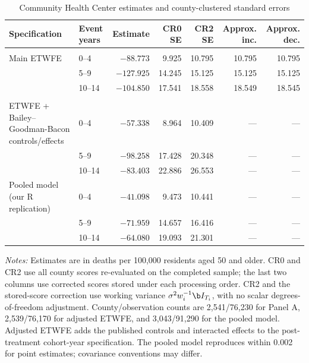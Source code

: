 \begin{table}[H]
\centering
\caption{Community Health Center estimates and county-clustered standard errors}
\label{tab:chc-estimates}
\scriptsize
\setlength{\tabcolsep}{3pt}
\begin{tabular}{@{}>{\raggedright\arraybackslash}p{}lrrrrr@{}}
\toprule
Specification & Event years & Estimate & CR0 SE & CR2 SE & Approx. inc. & Approx. dec. \\
\midrule
\multicolumn{7}{l}{\textit{Panel A. Saturated ETWFE}}\\
Main ETWFE & 0--4 & $-88.773$ & 9.925 & 10.795 & 10.795 & 10.795 \\
 & 5--9 & $-127.925$ & 14.245 & 15.125 & 15.125 & 15.125 \\
 & 10--14 & $-104.850$ & 17.541 & 18.558 & 18.549 & 18.545 \\
\addlinespace
\multicolumn{7}{l}{\textit{Panel B. Completed-sample comparisons}}\\
ETWFE + Bailey--Goodman-Bacon controls/effects & 0--4 & $-57.338$ & 8.964 & 10.409 & --- & --- \\
 & 5--9 & $-98.258$ & 17.428 & 20.348 & --- & --- \\
 & 10--14 & $-83.403$ & 22.886 & 26.553 & --- & --- \\
Pooled model (our R replication) & 0--4 & $-41.098$ & 9.473 & 10.441 & --- & --- \\
 & 5--9 & $-71.959$ & 14.657 & 16.416 & --- & --- \\
 & 10--14 & $-64.080$ & 19.093 & 21.301 & --- & --- \\
\bottomrule
\end{tabular}
\begin{minipage}{0.96\textwidth}
\footnotesize{}\raggedright
\textit{Notes:} Estimates are in deaths per 100,000 residents aged 50 and older. CR0 and CR2 use all county scores re-evaluated on the completed sample; the last two columns use corrected scores stored under each processing order. CR2 and the stored-score correction use working variance $\sigma^2w_i^{-1}\b I_{T_i}$, with no scalar degrees-of-freedom adjustment. County/observation counts are 2,541/76,230 for Panel A, 2,539/76,170 for adjusted ETWFE, and 3,043/91,290 for the pooled model. Adjusted ETWFE adds the published controls and interacted effects to the post-treatment cohort-year specification. The pooled model reproduces \citet[Table 2, Panel B, column 2]{baileyGoodmanBacon2015} within 0.002 for point estimates; covariance conventions may differ.
\end{minipage}
\end{table}
